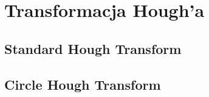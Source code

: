 \chapter{Transformacja Hough'a}

\section{Standard Hough Transform}

\section{Circle Hough Transform}

